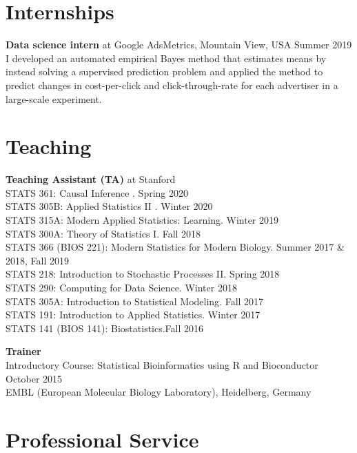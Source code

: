 \documentclass[margin,line]{res}
\newcommand{\ver}{\vspace*{-2.7mm}}
\begin{document}
\begin{resume}
\section{\sc Internships}
\textbf{Data science intern} at Google AdsMetrics, Mountain View, USA \hfill Summer 2019\\
I developed an automated empirical Bayes method that estimates means by instead solving a supervised prediction problem and applied the method to predict changes in cost-per-click and click-through-rate for each advertiser in a large-scale experiment.



\section{\sc Teaching}

\textbf{Teaching Assistant (TA)} at Stanford\\
STATS 361: Causal Inference . \hfill Spring 2020\\
STATS 305B: Applied Statistics II . \hfill Winter 2020\\
STATS 315A: Modern Applied Statistics: Learning. \hfill Winter 2019\\
STATS 300A: Theory of Statistics I. \hfill Fall 2018\\
STATS 366 (BIOS 221): Modern Statistics for Modern Biology. \hfill Summer 2017 \& 2018, Fall 2019\\
STATS 218: Introduction to Stochastic Processes II. \hfill Spring 2018\\
STATS 290: Computing for Data Science. \hfill Winter 2018\\
STATS 305A: Introduction to Statistical Modeling. \hfill Fall 2017\\
STATS 191: Introduction to Applied Statistics. \hfill Winter 2017\\
STATS 141 (BIOS 141): Biostatistics.\hfill Fall 2016

\ver
\textbf{Trainer}\\
Introductory Course: Statistical Bioinformatics using R and Bioconductor \hfill October 2015\\ EMBL (European Molecular Biology Laboratory), Heidelberg, Germany




\section{\sc Professional Service}


\end{resume}
\end{document}
